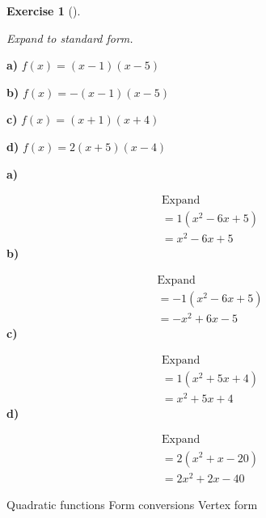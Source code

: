 \documentclass[
  letterpaper,
  DIV=11,
  numbers=noendperiod]{scrreprt}
\theoremstyle{definition}
\newtheorem{exercise}{Exercise}[chapter]
\theoremstyle{remark}
\begin{document}
\begin{exercise}[]\protect\hypertarget{exr-u7-24}{}\label{exr-u7-24}

\emph{Expand to standard form.}

\textbf{a)} \(\displaystyle f(x) = (x - 1)(x - 5)\)

\textbf{b)} \(\displaystyle f(x) = -(x - 1)(x - 5)\)

\textbf{c)} \(\displaystyle f(x) = (x + 1)(x + 4)\)

\textbf{d)} \(\displaystyle f(x) = 2(x + 5)(x - 4)\)

\begin{tcolorbox}[enhanced jigsaw, opacitybacktitle=0.6, coltitle=black, arc=.35mm, colframe=quarto-callout-tip-color-frame, colback=white, bottomrule=.15mm, left=2mm, colbacktitle=quarto-callout-tip-color!10!white, titlerule=0mm, opacityback=0, title=\textcolor{quarto-callout-tip-color}{\faLightbulb}\hspace{0.5em}{🔍 View Solutions}, leftrule=.75mm, breakable, rightrule=.15mm, bottomtitle=1mm, toptitle=1mm, toprule=.15mm]

\textbf{a)}

\[
\begin{aligned}
\text{Expand} \\[4pt] = 1(x^2 - 6x + 5) \\[4pt] = x^2 - 6x + 5
\end{aligned}
\] \textbf{b)}

\[
\begin{aligned}
\text{Expand} \\[4pt] = -1(x^2 - 6x + 5) \\[4pt] = -x^2 + 6x - 5
\end{aligned}
\] \textbf{c)}

\[
\begin{aligned}
\text{Expand} \\[4pt] = 1(x^2 + 5x + 4) \\[4pt] = x^2 + 5x + 4
\end{aligned}
\] \textbf{d)}

\[
\begin{aligned}
\text{Expand} \\[4pt] = 2(x^2 + x - 20) \\[4pt] = 2x^2 + 2x - 40
\end{aligned}
\]

\end{tcolorbox}

{Quadratic functions} {Form conversions} {Vertex form}

\end{exercise}
\end{document}
